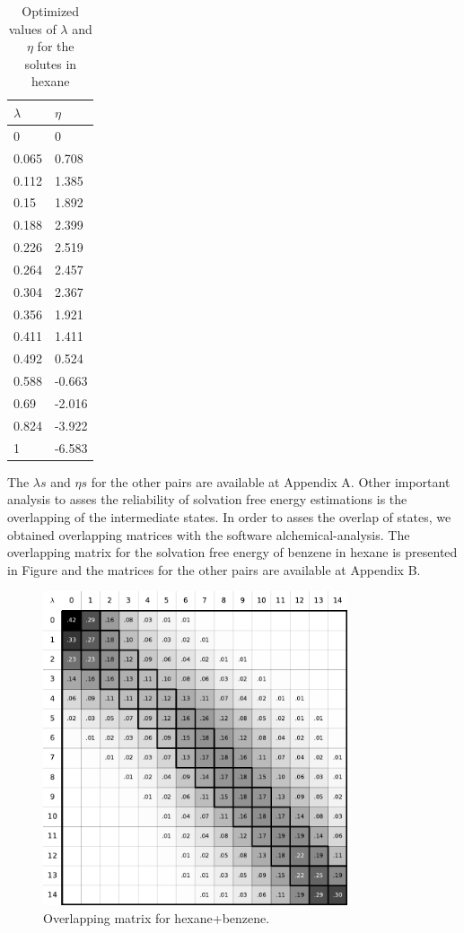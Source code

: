 \begin{table}[h]
	\centering
	\caption{Optimized values of $\lambda$ and $\eta$ for the solutes in hexane}
	\begin{tabular}{ll}
		\hline
        $\lambda$	&	$\eta$\\ 
        \hline		
        0	&	0\\ 
        0.065	&	0.708\\ 
        0.112	&	1.385\\ 
        0.15	&	1.892 \\ 
        0.188	&	2.399\\ 
        0.226	&	2.519\\ 
        0.264	&	2.457\\ 
        0.304	&	2.367\\ 
        0.356	&	1.921\\ 
        0.411	&	1.411\\ 
        0.492	&	0.524\\ 
        0.588	&	-0.663\\ 
        0.69	&	-2.016 \\ 
        0.824	&	-3.922\\ 
        1	    &	-6.583\\ 	
		\hline
	\end{tabular}
\end{table}

The $\lambda s$ and $\eta s$  for the other pairs are available at  Appendix A. Other important analysis  to asses the reliability of solvation free energy estimations  is the overlapping of the intermediate states. In order to asses the overlap of states, we obtained overlapping matrices with the software alchemical-analysis. The overlapping matrix for the solvation free energy of benzene in hexane is presented in Figure  and the matrices for the other pairs are available at Appendix B.  

\begin{figure}[H]
	\centering
	\includegraphics[width=0.8\textwidth]{Figures/ohex_benz}
	\caption{Overlapping matrix for hexane+benzene.}
    \label{fig:hexove}
\end{figure}


